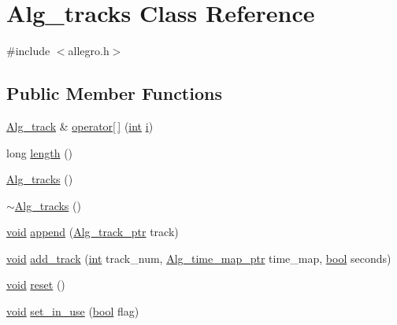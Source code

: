 \hypertarget{class_alg__tracks}{}\section{Alg\+\_\+tracks Class Reference}
\label{class_alg__tracks}


{\ttfamily \#include $<$allegro.\+h$>$}

\subsection*{Public Member Functions}
\begin{DoxyCompactItemize}
\item 
\hyperlink{class_alg__track}{Alg\+\_\+track} \& \hyperlink{class_alg__tracks_a7e20fba2125e3d322ac8d539a5a5161f}{operator\mbox{[}$\,$\mbox{]}} (\hyperlink{xmltok_8h_a5a0d4a5641ce434f1d23533f2b2e6653}{int} \hyperlink{checksum_8c_ab80e330a3bc9e38c1297fe17381e92b4}{i})
\item 
long \hyperlink{class_alg__tracks_ab0d2a685cb9d2a96778cc3d51e12679a}{length} ()
\item 
\hyperlink{class_alg__tracks_afd9b828c44257e7fb0916c8559059133}{Alg\+\_\+tracks} ()
\item 
\hyperlink{class_alg__tracks_a523f77007c79898d6b913ff3fd3b749a}{$\sim$\+Alg\+\_\+tracks} ()
\item 
\hyperlink{sound_8c_ae35f5844602719cf66324f4de2a658b3}{void} \hyperlink{class_alg__tracks_a712995a4cde5cde3af7f38ad8ce5e372}{append} (\hyperlink{allegro_8h_a4a72ca46459ff96c43e76567e345d0e0}{Alg\+\_\+track\+\_\+ptr} track)
\item 
\hyperlink{sound_8c_ae35f5844602719cf66324f4de2a658b3}{void} \hyperlink{class_alg__tracks_abb811c8706c269f0d353c5070ca3de8e}{add\+\_\+track} (\hyperlink{xmltok_8h_a5a0d4a5641ce434f1d23533f2b2e6653}{int} track\+\_\+num, \hyperlink{allegro_8h_a1a64b329a53ae040ef015de7ffd640dd}{Alg\+\_\+time\+\_\+map\+\_\+ptr} time\+\_\+map, \hyperlink{mac_2config_2i386_2lib-src_2libsoxr_2soxr-config_8h_abb452686968e48b67397da5f97445f5b}{bool} seconds)
\item 
\hyperlink{sound_8c_ae35f5844602719cf66324f4de2a658b3}{void} \hyperlink{class_alg__tracks_a02e08c1ddda4b39cdf9fb06adfdfa32b}{reset} ()
\item 
\hyperlink{sound_8c_ae35f5844602719cf66324f4de2a658b3}{void} \hyperlink{class_alg__tracks_a4d294938744e9e4a233f54a52ad61aa9}{set\+\_\+in\+\_\+use} (\hyperlink{mac_2config_2i386_2lib-src_2libsoxr_2soxr-config_8h_abb452686968e48b67397da5f97445f5b}{bool} flag)
\end{DoxyCompactItemize}
